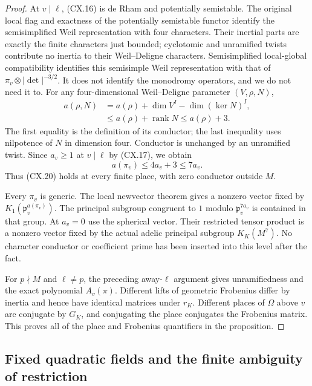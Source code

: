 \begin{proof}
At $v\mid\ell$, (CX.16) is de Rham and potentially
semistable.  The original local flag and exactness of the
potentially semistable functor identify the semisimplified
Weil representation with four characters.  Their inertial
parts are exactly the finite characters just bounded;
cyclotomic and unramified twists contribute no inertia to
their Weil--Deligne characters.  Semisimplified local-global
compatibility identifies this semisimple Weil representation
with that of $\pi_v\otimes|\det|^{-3/2}$.  It does not
identify the monodromy operators, and we do not need it to.
For any four-dimensional Weil--Deligne parameter $(V,\rho,N)$,
\[
 \begin{aligned}
 a(\rho,N)
  &=a(\rho)+\dim V^I-\dim(\ker N)^I,\\
  &\le a(\rho)+\operatorname{rank}N
   \le a(\rho)+3.
 \end{aligned}                                                \tag{CX.19}
\]
The first equality is the definition of its conductor; the
last inequality uses nilpotence of $N$ in dimension four.
Conductor is unchanged by an unramified twist.  Since
$a_v\ge1$ at $v\mid\ell$ by (CX.17), we obtain
\[
                    a(\pi_v)\le4a_v+3\le7a_v.                \tag{CX.20}
\]
Thus (CX.20) holds at every finite place, with zero conductor
outside $M$.

Every $\pi_v$ is generic.  The local newvector theorem gives
a nonzero vector fixed by $K_1(\mathfrak p_v^{a(\pi_v)})$.
The principal subgroup congruent to $1$ modulo
$\mathfrak p_v^{7a_v}$ is contained in that group.  At
$a_v=0$ use the spherical vector.  Their restricted tensor
product is a nonzero vector fixed by the actual adelic
principal subgroup $K_K(M^7)$.  No character conductor or
coefficient prime has been inserted into this level after
the fact.

For $p\nmid M$ and $\ell\ne p$, the preceding away-$\ell$
argument gives unramifiedness and the exact polynomial
$A_v(\pi)$.  Different lifts of geometric Frobenius differ
by inertia and hence have identical matrices under $r_K$.
Different places of $\Omega$ above $v$ are conjugate by
$G_K$, and conjugating the place conjugates the Frobenius
matrix.  This proves all of the place and Frobenius
quantifiers in the proposition.
\end{proof}

\subsection{Fixed quadratic fields and the finite ambiguity of restriction}

